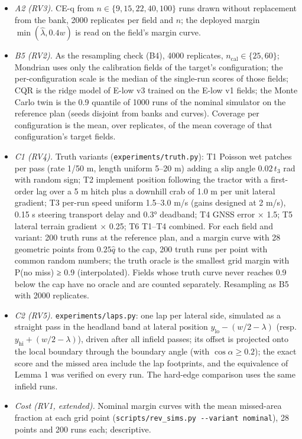 \documentclass[preprint,12pt,authoryear]{elsarticle}
\providecommand{\tightlist}{\setlength{\itemsep}{0pt}\setlength{\parskip}{0pt}}
\begin{document}
\begin{itemize}
\tightlist
\item
  \emph{A2 (RV3).} CE-q from \(n\in\{9,15,22,40,100\}\) runs drawn without replacement from the bank, 2000 replicates per field and \(n\); the deployed margin \(\min(\hat\lambda,0.4w)\) is read on the field's margin curve.
\item
  \emph{B5 (RV2).} As the resampling check (B4), 4000 replicates, \(n_\mathrm{cal}\in\{25,60\}\); Mondrian uses only the calibration fields of the target's configuration; the per-configuration scale is the median of the single-run scores of those fields; CQR is the ridge model of E-low v3 trained on the E-low v1 fields; the Monte Carlo twin is the 0.9 quantile of 1000 runs of the nominal simulator on the reference plan (seeds disjoint from banks and curves). Coverage per configuration is the mean, over replicates, of the mean coverage of that configuration's target fields.
\item
  \emph{C1 (RV4).} Truth variants (\texttt{experiments/truth.py}): T1 Poisson wet patches per pass (rate 1/50 m, length uniform 5--20 m) adding a slip angle \(0.02\,t_3\) rad with random sign; T2 implement position following the tractor with a first-order lag over a 5 m hitch plus a downhill crab of 1.0 m per unit lateral gradient; T3 per-run speed uniform 1.5--3.0 m/s (gains designed at 2 m/s), 0.15 s steering transport delay and 0.3° deadband; T4 GNSS error × 1.5; T5 lateral terrain gradient × 0.25; T6 T1--T4 combined. For each field and variant: 200 truth runs at the reference plan, and a margin curve with 28 geometric points from \(0.25\hat q\) to the cap, 200 truth runs per point with common random numbers; the truth oracle is the smallest grid margin with P(no miss) ≥ 0.9 (interpolated). Fields whose truth curve never reaches 0.9 below the cap have no oracle and are counted separately. Resampling as B5 with 2000 replicates.
\item
  \emph{C2 (RV5).} \texttt{experiments/laps.py}: one lap per lateral side, simulated as a straight pass in the headland band at lateral position \(y_\mathrm{lo}-(w/2-\lambda)\) (resp. \(y_\mathrm{hi}+(w/2-\lambda)\)), driven after all infield passes; its offset is projected onto the local boundary through the boundary angle (with \(\cos\alpha\ge0.2\)); the exact score and the missed area include the lap footprints, and the equivalence of Lemma 1 was verified on every run. The hard-edge comparison uses the same infield runs.
\item
  \emph{Cost (RV1, extended).} Nominal margin curves with the mean missed-area fraction at each grid point (\texttt{scripts/rev\_sims.py\ -\/-variant\ nominal}), 28 points and 200 runs each; descriptive.
\end{itemize}
\end{document}
